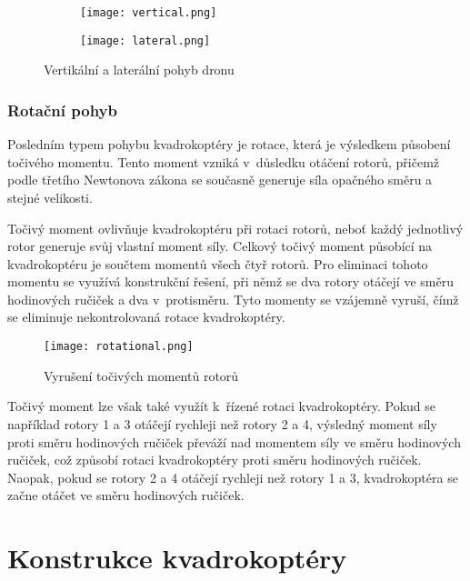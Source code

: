 \documentclass[12pt]{report}
\begin{document}
\begin{figure}[H]
    \begin{subfigure}{0.45\linewidth}
        \centering
        \texttt{[image: vertical.png]}
    \end{subfigure}
    \hfill
    \begin{subfigure}{0.45\linewidth}
        \texttt{[image: lateral.png]}
    \end{subfigure}
    \caption{Vertikální a laterální pohyb dronu \cite{nasa}}
    \label{fig:batteries}
\end{figure}

\section[Rotační pohyb]{Rotační pohyb}
Posledním typem pohybu kvadrokoptéry je rotace, která je výsledkem působení točivého momentu. Tento moment vzniká v~důsledku otáčení rotorů, přičemž podle třetího Newtonova zákona se současně generuje síla opačného směru a stejné velikosti.

Točivý moment ovlivňuje kvadrokoptéru při rotaci rotorů, neboť každý jednotlivý rotor generuje svůj vlastní moment síly. Celkový točivý moment působící na kvadrokoptéru je součtem momentů všech čtyř rotorů. Pro eliminaci tohoto momentu se využívá konstrukční řešení, při němž se dva rotory otáčejí ve směru hodinových ručiček a dva v~protisměru. Tyto momenty se vzájemně vyruší, čímž se eliminuje nekontrolovaná rotace kvadrokoptéry.

\begin{figure}[H]
	\centering
	\texttt{[image: rotational.png]}
	\caption{Vyrušení točivých momentů rotorů \cite{nasa}}
	\label{fig:rotational.png}
\end{figure}

Točivý moment lze však také využít k~řízené rotaci kvadrokoptéry. Pokud se například rotory 1 a 3 otáčejí rychleji než rotory 2 a 4, výsledný moment síly proti směru hodinových ručiček převáží nad momentem síly ve směru hodinových ručiček, což způsobí rotaci kvadrokoptéry proti směru hodinových ručiček. Naopak, pokud se rotory 2 a 4 otáčejí rychleji než rotory 1 a 3, kvadrokoptéra se začne otáčet ve směru hodinových ručiček. \cite{nasa} \cite{ca}
\part{Konstrukce kvadrokoptéry} %
\end{document}

